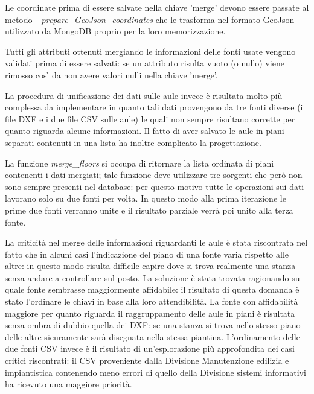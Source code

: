 \documentclass[12pt]{report}
\begin{document}
\vspace{5mm} %

Le coordinate prima di essere salvate nella chiave 'merge' devono essere passate al metodo \textit{\_prepare\_GeoJson\_coordinates} che le trasforma nel formato GeoJson utilizzato da MongoDB proprio per la loro memorizzazione.

Tutti gli attributi ottenuti mergiando le informazioni delle fonti usate vengono validati prima di essere salvati: se un attributo risulta vuoto (o nullo) viene rimosso così da non avere valori nulli nella chiave 'merge'.

\vspace{5mm} %

La procedura di unificazione dei dati sulle aule invece è risultata molto più complessa da implementare in quanto tali dati provengono da tre fonti diverse (i file DXF e i due file CSV sulle aule) le quali non sempre risultano corrette per quanto riguarda alcune informazioni. Il fatto di aver salvato le aule in piani separati contenuti in una lista ha inoltre complicato la progettazione.

La funzione \textit{merge\_floors} si occupa di ritornare la lista ordinata di piani contenenti i dati mergiati; tale funzione deve utilizzare tre sorgenti che però non sono sempre presenti nel database: per questo motivo tutte le operazioni sui dati lavorano solo su due fonti per volta.
In questo modo alla prima iterazione le prime due fonti verranno unite e il risultato parziale verrà poi unito alla terza fonte.

La criticità nel merge delle informazioni riguardanti le aule è stata riscontrata nel fatto che in alcuni casi l'indicazione del piano di una fonte varia rispetto alle altre: in questo modo risulta difficile capire dove si trova realmente una stanza senza andare a controllare sul posto.
La soluzione è stata trovata ragionando su quale fonte sembrasse maggiormente affidabile: il risultato di questa domanda è stato l'ordinare le chiavi in base alla loro attendibilità.
La fonte con affidabilità maggiore per quanto riguarda il raggruppamento delle aule in piani è risultata senza ombra di dubbio quella dei DXF: se una stanza si trova nello stesso piano delle altre sicuramente sarà disegnata nella stessa piantina. L'ordinamento delle due fonti CSV invece è il risultato di un'esplorazione più approfondita dei casi critici riscontrati: il CSV proveniente dalla Divisione Manutenzione edilizia e impiantistica contenendo meno errori di quello della Divisione sistemi informativi ha ricevuto una maggiore priorità.
\end{document}
